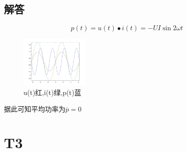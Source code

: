 \documentclass[10pt, a4paper]{article} %
\begin{document}
\subsection{解答}
$$
p(t) = u(t)\bullet i(t) = -UI\sin2\omega t
$$
\begin{figure}[h]
    \centering
    \begin{minipage}[t]{\textwidth}
        \centering
        \includegraphics[width=0.3\textwidth]{image/T2.jpg}
    \caption{u(t)红,i(t)绿,p(t)蓝}
    \end{minipage}
    
\end{figure}
据此可知平均功率为$\overline{p} = 0 $

\clearpage

\section{T3}
\end{document}
